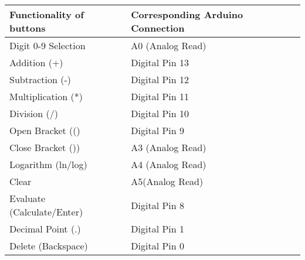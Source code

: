 \begin{table}[h!]
    \centering
    \renewcommand{\arraystretch}{1.3}
    \begin{tabular}{|l|l|}
        \hline
        \textbf{Functionality of buttons} & \textbf{Corresponding Arduino Connection} \\
        \hline
        Digit 0-9 Selection & A0 (Analog Read) \\
        Addition (+) & Digital Pin 13 \\
        Subtraction (-) & Digital Pin 12 \\
        Multiplication (*) & Digital Pin 11 \\
        Division (/) & Digital Pin 10 \\
        Open Bracket (() & Digital Pin 9 \\
        Close Bracket ()) & A3 (Analog Read) \\
        Logarithm (ln/log) & A4 (Analog Read) \\
        Clear & A5(Analog Read) \\
        Evaluate (Calculate/Enter) & Digital Pin 8 \\
        Decimal Point (.) & Digital Pin 1 \\
        Delete (Backspace) & Digital Pin 0 \\
        \hline
    \end{tabular}
    \label{tab:button_connections}
\end{table}

